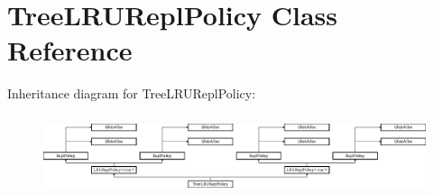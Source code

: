 \hypertarget{classTreeLRUReplPolicy}{\section{Tree\-L\-R\-U\-Repl\-Policy Class Reference}
\label{classTreeLRUReplPolicy}
}
Inheritance diagram for Tree\-L\-R\-U\-Repl\-Policy\-:\begin{figure}[H]
\begin{center}
\leavevmode
\includegraphics[height=2.348993cm]{classTreeLRUReplPolicy}
\end{center}
\end{figure}

